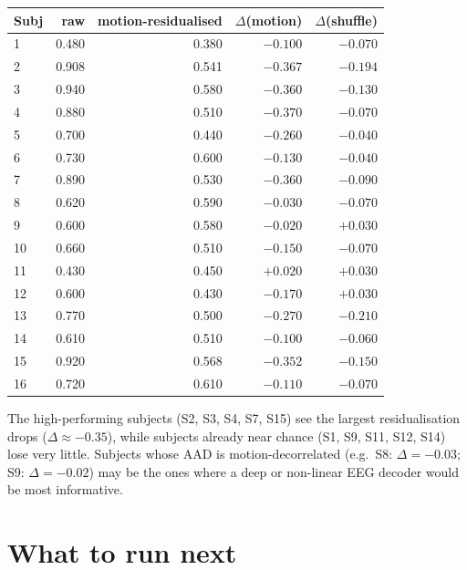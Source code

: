 \begin{table}[ht]
\centering
\begin{tabular}{lrrrr}
\toprule
Subj & raw & motion-residualised & $\Delta$(motion) & $\Delta$(shuffle) \\
\midrule
1  & 0.480 & 0.380 & $-0.100$ & $-0.070$ \\
2  & 0.908 & 0.541 & $-0.367$ & $-0.194$ \\
3  & 0.940 & 0.580 & $-0.360$ & $-0.130$ \\
4  & 0.880 & 0.510 & $-0.370$ & $-0.070$ \\
5  & 0.700 & 0.440 & $-0.260$ & $-0.040$ \\
6  & 0.730 & 0.600 & $-0.130$ & $-0.040$ \\
7  & 0.890 & 0.530 & $-0.360$ & $-0.090$ \\
8  & 0.620 & 0.590 & $-0.030$ & $-0.070$ \\
9  & 0.600 & 0.580 & $-0.020$ & $+0.030$ \\
10 & 0.660 & 0.510 & $-0.150$ & $-0.070$ \\
11 & 0.430 & 0.450 & $+0.020$ & $+0.030$ \\
12 & 0.600 & 0.430 & $-0.170$ & $+0.030$ \\
13 & 0.770 & 0.500 & $-0.270$ & $-0.210$ \\
14 & 0.610 & 0.510 & $-0.100$ & $-0.060$ \\
15 & 0.920 & 0.568 & $-0.352$ & $-0.150$ \\
16 & 0.720 & 0.610 & $-0.110$ & $-0.070$ \\
\bottomrule
\end{tabular}
\end{table}

\noindent
The high-performing subjects (S2, S3, S4, S7, S15) see the largest
residualisation drops ($\Delta \approx -0.35$), while subjects already
near chance (S1, S9, S11, S12, S14) lose very little. Subjects whose
AAD is motion-decorrelated (e.g.\ S8: $\Delta = -0.03$; S9:
$\Delta = -0.02$) may be the ones where a deep or non-linear EEG
decoder would be most informative.

\section{What to run next}


